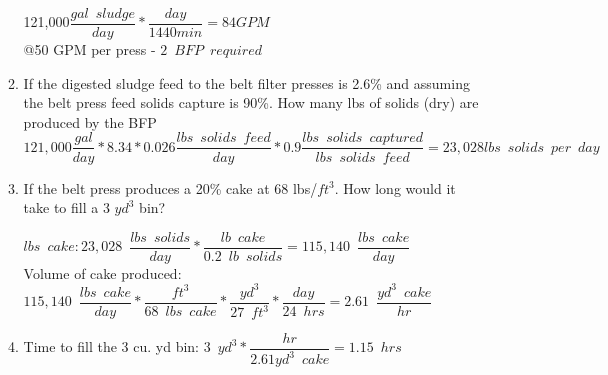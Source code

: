\documentclass{article}
\begin{document}
\begin{enumerate}
\begin{enumerate}
121,000$\dfrac{gal \enspace sludge}{day}*\dfrac{day}{1440min}=84 GPM$\\
@50 GPM per press - $\boxed{2 \enspace BFP \enspace required}$

\item If the digested sludge feed to the belt filter presses is 2.6\% and assuming the belt press feed solids capture is 90\%.  How many lbs of solids (dry) are produced by the BFP \\
$121,000\dfrac{gal}{day}*8.34*0.026\dfrac{lbs \enspace solids \enspace feed}{day}*0.9\dfrac{lbs \enspace solids \enspace captured}{lbs \enspace solids \enspace feed}=\boxed{23,028 lbs \enspace solids \enspace per \enspace day}$

\item If the belt press produces a 20\% cake at 68 lbs/$ft^3$.  How long would it take to fill a 3 $yd^3$ bin?
\vspace{0.3cm}

$lbs \enspace cake: 23,028 \enspace \dfrac{lbs \enspace solids}{day}*\dfrac{lb \enspace cake}{0.2 \enspace lb \enspace solids}=115,140 \enspace \dfrac{lbs \enspace cake}{day}$\\

\vspace{0.3cm}
Volume of cake produced: $115,140 \enspace \dfrac{lbs \enspace cake}{day}*\dfrac{ft^3}{68 \enspace lbs \enspace cake}*\dfrac{yd^3}{27 \enspace ft^3}*\dfrac{day}{24 \enspace hrs} =2.61 \enspace \dfrac{yd^3 \enspace cake}{hr}$
\item Time to fill the 3 cu. yd bin: $3 \enspace yd^3 *\dfrac{hr}{2.61 yd^3 \enspace cake}=\boxed{1.15 \enspace hrs}$

 
\end{enumerate}


\end{enumerate}
\end{document}
